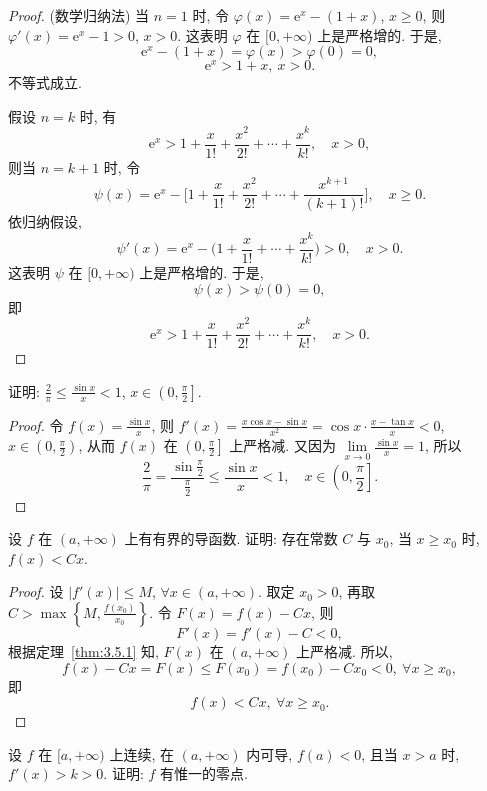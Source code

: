 \begin{proof}
(数学归纳法) 当 $n=1$ 时, 令 $\varphi(x)=\mathrm{e}^{x}-(1+x)$, $x\geqslant 0$, 则 $\varphi'(x)=\mathrm{e}^{x}-1>0$, $x>0$. 这表明 $\varphi$ 在 $[0,+\infty)$ 上是严格增的. 于是,
\[
\mathrm{e}^{x}-(1+x)=\varphi(x)>\varphi(0)=0,
\]
\[
\mathrm{e}^{x}>1+x,\ x>0.
\]
不等式成立.

假设 $n=k$ 时, 有
\[
\mathrm{e}^{x}>1+\frac{x}{1!}+\frac{x^{2}}{2!}+\cdots+\frac{x^{k}}{k!},\quad x>0,
\]
则当 $n=k+1$ 时, 令
\[
\psi(x)=\mathrm{e}^{x}-\Big[1+\frac{x}{1!}+\frac{x^{2}}{2!}+\cdots+\frac{x^{k+1}}{(k+1)!}\Big],\quad x\geqslant 0.
\]
依归纳假设,
\[
\psi'(x)=\mathrm{e}^{x}-\Big(1+\frac{x}{1!}+\cdots+\frac{x^{k}}{k!}\Big)>0,\quad x>0.
\]
这表明 $\psi$ 在 $[0,+\infty)$ 上是严格增的. 于是,
\[
\psi(x)>\psi(0)=0,
\]
即
\[
\mathrm{e}^{x}>1+\frac{x}{1!}+\frac{x^{2}}{2!}+\cdots+\frac{x^{k}}{k!},\quad x>0.
\]
\end{proof}

\begin{example}\label{ex:3.5.5}
证明: $\frac{2}{\pi}\leqslant\frac{\sin x}{x}<1$, $x\in\left(0,\frac{\pi}{2}\right]$.
\end{example}

\begin{proof}
令 $f(x)=\frac{\sin x}{x}$, 则 $f'(x)=\frac{x\cos x-\sin x}{x^{2}}=\cos x\cdot\frac{x-\tan x}{x}<0$, $x\in\left(0,\frac{\pi}{2}\right)$, 从而 $f(x)$ 在 $\left(0,\frac{\pi}{2}\right]$ 上严格减. 又因为 $\lim\limits_{x\to 0}\frac{\sin x}{x}=1$, 所以
\[
\frac{2}{\pi}=\frac{\sin\frac{\pi}{2}}{\frac{\pi}{2}}\leqslant\frac{\sin x}{x}<1,\quad x\in\left(0,\frac{\pi}{2}\right].
\]
\end{proof}

\begin{example}\label{ex:3.5.6}
设 $f$ 在 $(a,+\infty)$ 上有有界的导函数. 证明: 存在常数 $C$ 与 $x_{0}$, 当 $x\geqslant x_{0}$ 时, $f(x)<Cx$.
\end{example}

\begin{proof}
设 $|f'(x)|\leqslant M$, $\forall x\in(a,+\infty)$. 取定 $x_{0}>0$, 再取 $C>\max\left\{M,\frac{f(x_{0})}{x_{0}}\right\}$. 令 $F(x)=f(x)-Cx$, 则
\[
F'(x)=f'(x)-C<0,
\]
根据定理~\ref{thm:3.5.1} 知, $F(x)$ 在 $(a,+\infty)$ 上严格减. 所以,
\[
f(x)-Cx=F(x)\leqslant F(x_{0})=f(x_{0})-Cx_{0}<0,\ \forall x\geqslant x_{0},
\]
即
\[
f(x)<Cx,\ \forall x\geqslant x_{0}.
\]
\end{proof}

\begin{example}\label{ex:3.5.7}
设 $f$ 在 $[a,+\infty)$ 上连续, 在 $(a,+\infty)$ 内可导, $f(a)<0$, 且当 $x>a$ 时, $f'(x)>k>0$. 证明: $f$ 有惟一的零点.
\end{example}

